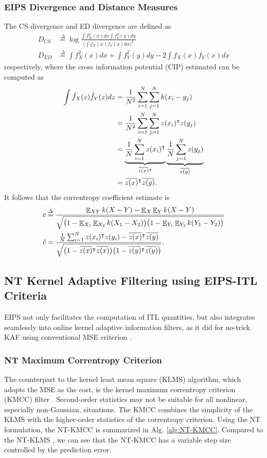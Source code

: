 \documentclass[8pt,twocolumn]{IEEEtran}
\DeclareMathOperator{\Ex}{\mathbb{E}}
\newcommand{\overbar}[1]{\mkern 1.5mu\overline{\mkern-1.5mu#1\mkern-1.5mu}\mkern 1.5mu}
\begin{document}
\subsubsection{EIPS Divergence and Distance Measures}
The CS divergence and ED divergence are defined as
\begin{align}
D_{CS}&\stackrel{\Delta}{=}\log\frac{\int f^2_X(x)dx\int f^2_Y(y)dy}{\big(\int f_X(x) f_Y(x)dx\big)^2}\\
D_{ED}&\stackrel{\Delta}{=}\int f^2_X(x)dx + \int f^2_Y(y)dy-2\int f_X(x) f_Y(x)dx
\end{align}
respectively, where the cross information potential (CIP) estimated can be computed as
\begin{align}
\int \hat{f}_X(z)\hat{f}_Y(z)dz&=\frac{1}{N^2}\sum_{i=1}^{N}\sum_{j=1}^{N}k(x_i-y_j)\nonumber\\
&=\frac{1}{N^2}\sum_{i=1}^{N}\sum_{j=1}^{N}z(x_i)^\intercal z(y_j)\nonumber\\
&=\underbrace{\frac{1}{N}\sum_{i=1}^{N}z(x_i)^\intercal}_{\overbar{z(x)}^\intercal}\underbrace{\frac{1}{N}\sum_{j=1}^{N}z(y_j)}_{\overbar{z(y)}}\nonumber\\
&=\overbar{z(x)}^\intercal \overbar{z(y)}.
\end{align}
It follows that the correntropy coefficient estimate is
\begin{align}
c&\stackrel{\Delta}{=}\frac{\Ex_{XY}k(X-Y)-\Ex_{X}\Ex_{Y}k(X-Y)}{\sqrt{\big(1-\Ex_{X_1}\Ex_{X_2}k(X_1-X_2)\big)\big(1-\Ex_{Y_1}\Ex_{Y_2}k(Y_1-Y_2)\big)}}\nonumber\\
\hat{c}&=\frac{\frac{1}{N}\sum_{i=1}^N z(x_i)^\intercal z(y_i)-\overbar{z(x)}^\intercal \overbar{z(y)}}{\sqrt{\big(1-\overbar{z(x)}^\intercal \overbar{z(x)}\big)\big(1-\overbar{z(y)}^\intercal \overbar{z(y)}\big)}}.
\end{align}

\subsection{NT Kernel Adaptive Filtering using EIPS-ITL Criteria}\label{Sec:KAF}
EIPS not only facilitates the computation of ITL quantities, but also integrates seamlessly into online kernel adaptive information filters, as it did for no-trick KAF using conventional MSE criterion \cite{Li2019notrick}.
\subsubsection{NT Maximum Correntropy Criterion}\label{Sec:KAF}
The counterpart to the kernel least mean square (KLMS) \cite{KLMS} algorithm, which adopts the MSE as the cost, is the kernel maximum correntropy criterion (KMCC) filter \cite{KMCC}. Second-order statistics may not be suitable for all nonlinear, especially non-Gaussian, situations. The KMCC combines the simplicity of the KLMS with the higher-order statistics of the correntropy criterion. Using the NT formulation, the NT-KMCC is summarized in Alg. \ref{alg:NT-KMCC}. Compared to the NT-KLMS \cite{Li2019notrick}, we can see that the NT-KMCC has a variable step size controlled by the prediction error.
\end{document}
